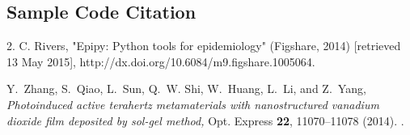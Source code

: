 \documentclass[9pt,twocolumn,twoside]{osajnl}
\begin{document}
\subsection{Sample Code Citation}

2. C. Rivers, "Epipy: Python tools for epidemiology" (Figshare, 2014) [retrieved 13 May 2015], http://dx.doi.org/10.6084/m9.figshare.1005064.



\begin{thebibliography}{1}
Y.~Zhang, S.~Qiao, L.~Sun, Q.~W. Shi, W.~Huang, L.~Li, and Z.~Yang, \emph{Photoinduced active terahertz metamaterials with nanostructured vanadium dioxide film deposited by sol-gel method,} Opt. Express \textbf{22}, 11070--11078 (2014).
 .
\end{thebibliography}
\end{document}
